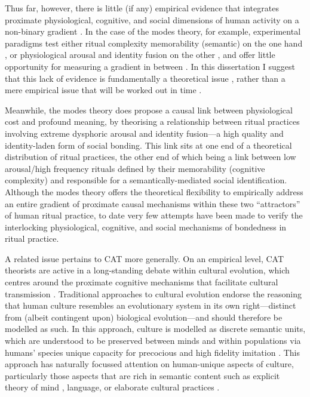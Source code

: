 \begin{CJK}{UTF8}{gbsn}
Thus far, however, there is little (if any) empirical evidence that integrates proximate physiological, cognitive, and social dimensions of human activity on a non-binary gradient \citep{Atran2010}.  In the case of the modes theory, for example, experimental paradigms test either ritual complexity memorability (semantic) on the one hand \citep{Whitehouse2005}, or physiological arousal and identity fusion on the other \citep{Whitehouse2014,Whitehouse2017,Swann2010a,Richert2005}, and offer little opportunity for measuring a gradient in between \citep[but see][]{Russell2014}.  In this dissertation I suggest that this lack of evidence is fundamentally a theoretical issue \citep{Clark2015}, rather than a mere empirical issue that will be worked out in time \citep[cf.][]{Whitehouse2014a}.


Meanwhile, the modes theory \citep[cf.][]{Whitehouse2004} does propose a causal link between physiological cost and profound meaning, by theorising a relationship between ritual practices involving extreme dysphoric arousal and identity fusion---a high quality and identity-laden form of social bonding.  This link sits at one end of a theoretical distribution of ritual practices, the other end of which being a link between low arousal/high frequency rituals defined by their memorability (cognitive complexity) and responsible for a semantically-mediated social identification.  Although the modes theory offers the theoretical flexibility to empirically address an entire gradient of proximate causal mechanisms within these two ``attractors'' of human ritual practice, to date very few attempts have been made to verify the interlocking physiological, cognitive, and social mechanisms of bondedness in ritual practice.


A related issue pertains to CAT more generally.  On an empirical level, CAT theorists are active in a long-standing debate within cultural evolution, which centres around the proximate cognitive mechanisms that facilitate cultural transmission \citep{Acerbi2015,Scott-Phillips2018}.  Traditional approaches to cultural evolution endorse the reasoning that human culture resembles an evolutionary system in its own right---distinct from (albeit contingent upon) biological evolution---and should therefore be modelled as such.  In this approach, culture is modelled as discrete semantic units, which are understood to be preserved between minds and within populations via humans' species unique capacity for precocious and high fidelity imitation \citep[i.e., like genes, culture is preserved through processes of exact replication with natural copying error and drift][]{Henrich2003,Tomasello2011}. This approach has naturally focussed attention on human-unique aspects of culture, particularly those aspects that are rich in semantic content such as explicit theory of mind \citep{Tomasello2005}, language, or elaborate cultural practices \citep{}.


\end{CJK}
